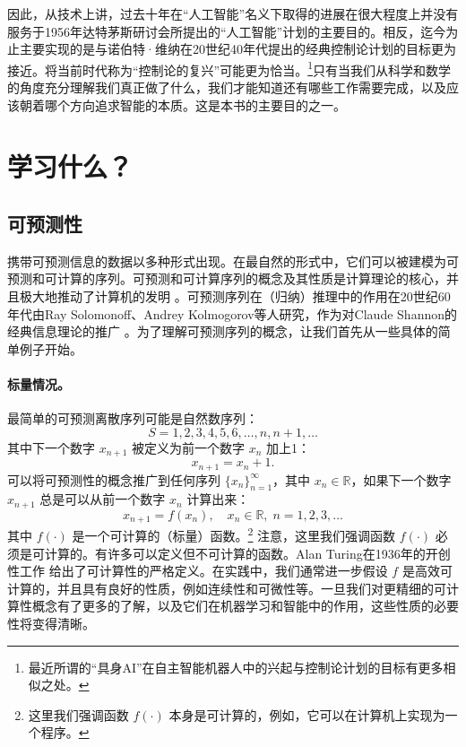 \documentclass[../../book-main.tex]{subfiles}
\begin{document}
因此，从技术上讲，过去十年在“人工智能”名义下取得的进展在很大程度上并没有服务于1956年达特茅斯研讨会所提出的“人工智能”计划的主要目的。相反，迄今为止主要实现的是与诺伯特·维纳在20世纪40年代提出的经典控制论计划的目标更为接近。将当前时代称为“控制论的复兴”可能更为恰当。\footnote{最近所谓的“具身AI”在自主智能机器人中的兴起与控制论计划的目标有更多相似之处。}只有当我们从科学和数学的角度充分理解我们真正做了什么，我们才能知道还有哪些工作需要完成，以及应该朝着哪个方向追求智能的本质。这是本书的主要目的之一。

\section{学习什么？}
\label{sec:what-to-learn}

\subsection{可预测性}
\label{sec:predictability}
携带可预测信息的数据以多种形式出现。在最自然的形式中，它们可以被建模为可预测和可计算的序列。可预测和可计算序列的概念及其性质是计算理论的核心，并且极大地推动了计算机的发明 \cite{Turing-1936}。可预测序列在（归纳）推理中的作用在20世纪60年代由Ray Solomonoff、Andrey Kolmogorov等人研究，作为对Claude Shannon的经典信息理论的推广 \cite{Kolmogorov1998OnTO}。为了理解可预测序列的概念，让我们首先从一些具体的简单例子开始。

\paragraph{标量情况。} 最简单的可预测离散序列可能是自然数序列：
\begin{equation}
   {S} =  1, 2, 3, 4, 5, 6, \ldots, n, n+1, \ldots
\end{equation}
其中下一个数字 $x_{n+1}$ 被定义为前一个数字 $x_n$ 加上1：
\begin{equation}
x_{n+1} = x_n + 1.    
\end{equation}
可以将可预测性的概念推广到任何序列 $\{x_n\}_{n=1}^\infty$，其中 $ x_n \in \mathbb{R}$，如果下一个数字 $x_{n+1}$ 总是可以从前一个数字 $x_n$ 计算出来：
\begin{equation}
    x_{n+1} = f(x_{n}), \quad x_n \in \mathbb{R}, \; n =  1, 2, 3, \ldots
\end{equation}
其中 $f(\cdot)$ 是一个可计算的（标量）函数。\footnote{这里我们强调函数 $f(\cdot)$ 本身是可计算的，例如，它可以在计算机上实现为一个程序。} 注意，这里我们强调函数 $f(\cdot)$ 必须是可计算的。有许多可以定义但不可计算的函数。Alan Turing在1936年的开创性工作 \cite{Turing-1936} 给出了可计算性的严格定义。在实践中，我们通常进一步假设 $f$ 是高效可计算的，并且具有良好的性质，例如连续性和可微性等。一旦我们对更精细的可计算性概念有了更多的了解，以及它们在机器学习和智能中的作用，这些性质的必要性将变得清晰。
\end{document}
